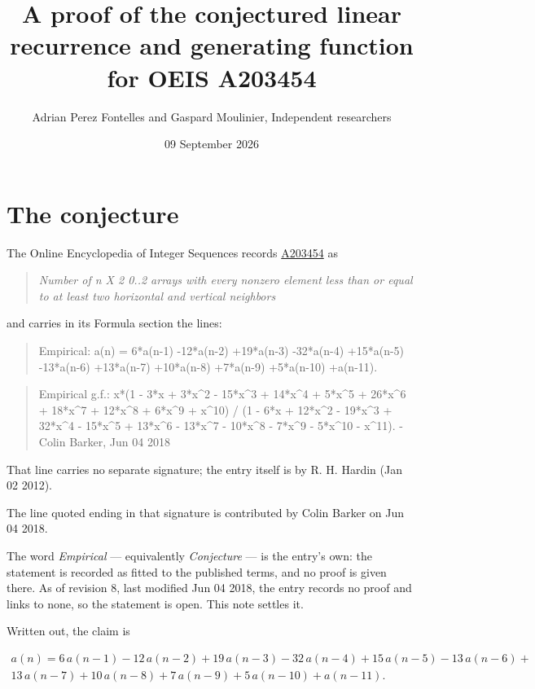 \documentclass[11pt]{article}
\title{A proof of the conjectured linear recurrence and generating function for OEIS A203454}
\author{Adrian Perez Fontelles and Gaspard Moulinier, Independent researchers}
\date{09 September 2026}
\theoremstyle{definition}
\begin{document}
\maketitle
\section{The conjecture}

The Online Encyclopedia of Integer Sequences records \href{https://oeis.org/A203454}{A203454} as

\begin{quote}\itshape Number of n X 2 0..2 arrays with every nonzero element less than or equal to at least two horizontal and vertical neighbors\end{quote}

and carries in its Formula section the lines:

\begin{quote}\ttfamily Empirical: a(n) = 6*a(n-1) -12*a(n-2) +19*a(n-3) -32*a(n-4) +15*a(n-5) -13*a(n-6) +13*a(n-7) +10*a(n-8) +7*a(n-9) +5*a(n-10) +a(n-11).\end{quote}

\begin{quote}\ttfamily Empirical g.f.: x*(1 - 3*x + 3*x\textasciicircum{}2 - 15*x\textasciicircum{}3 + 14*x\textasciicircum{}4 + 5*x\textasciicircum{}5 + 26*x\textasciicircum{}6 + 18*x\textasciicircum{}7 + 12*x\textasciicircum{}8 + 6*x\textasciicircum{}9 + x\textasciicircum{}10) / (1 - 6*x + 12*x\textasciicircum{}2 - 19*x\textasciicircum{}3 + 32*x\textasciicircum{}4 - 15*x\textasciicircum{}5 + 13*x\textasciicircum{}6 - 13*x\textasciicircum{}7 - 10*x\textasciicircum{}8 - 7*x\textasciicircum{}9 - 5*x\textasciicircum{}10 - x\textasciicircum{}11). - Colin Barker, Jun 04 2018\end{quote}

That line carries no separate signature; the entry itself is by R. H. Hardin (Jan 02 2012).

The line quoted ending in that signature is contributed by Colin Barker on Jun 04 2018.

The word {\itshape Empirical} --- equivalently {\itshape Conjecture} --- is the entry's own: the statement is recorded as fitted to the published terms, and no proof is given there. As of revision 8, last modified Jun 04 2018, the entry records no proof and links to none, so the statement is open. This note settles it.

Written out, the claim is

\begin{multline*} a(n) = 6\,a(n-1) - 12\,a(n-2) + 19\,a(n-3) - 32\,a(n-4) + 15\,a(n-5) - 13\,a(n-6) + \\ 13\,a(n-7) + 10\,a(n-8) + 7\,a(n-9) + 5\,a(n-10) + a(n-11). \end{multline*}
\end{document}
